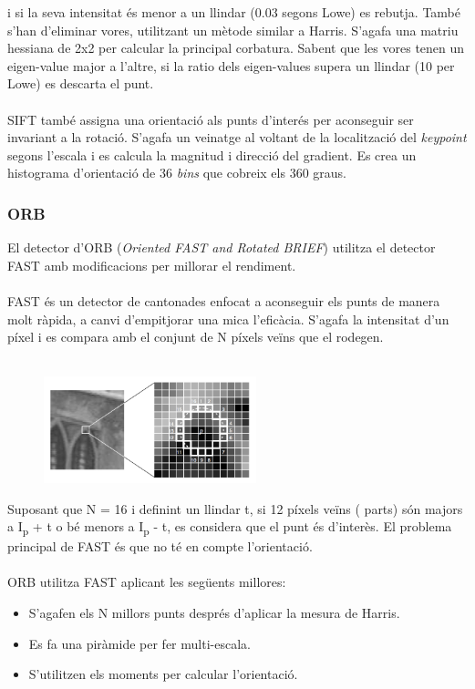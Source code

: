 	i si la seva intensitat és menor a un llindar (0.03 segons Lowe) es rebutja. També s'han d'eliminar vores, utilitzant un mètode similar a Harris.
	S'agafa una matriu hessiana de 2x2 per calcular la principal corbatura. Sabent que les vores tenen un eigen-value major a l'altre, si la ratio dels
	{eigen-values} supera un llindar (10 per Lowe) es descarta el punt. \\\\
	SIFT també assigna una orientació als punts d'interés per aconseguir ser invariant a la rotació. S'agafa un veinatge al voltant de la localització del
	\textit{keypoint} segons l'escala i es calcula la magnitud i direcció del gradient. Es crea un histograma d'orientació de 36 \textit{bins}
	que cobreix els 360 graus.

	\subsubsection{ORB}
	El detector d'ORB (\textit{Oriented FAST and Rotated BRIEF}) utilitza el detector FAST amb modificacions per millorar el rendiment.\\\\
	FAST és un detector de cantonades enfocat a aconseguir els punts de manera molt ràpida, a canvi d'empitjorar una mica l'eficàcia. S'agafa la intensitat d'un píxel i es compara amb el conjunt
	de N píxels veïns que el rodegen.\\\\
	\begin{figure}[H]
		\centering
		\includegraphics[width=0.55\textwidth]{images/fast}
	\end{figure}
	\noindent
	Suposant que N = 16 i definint un llindar t, si 12 píxels veïns ( parts) són majors a I\textsubscript{p} + t o bé menors a I\textsubscript{p} - t, es considera que el punt és d'interès.
	El problema principal de FAST és que no té en compte l'orientació.\\\\
	ORB utilitza FAST aplicant les següents millores:\\
	\begin{itemize}
		\item{S'agafen els N millors punts després d'aplicar la mesura de Harris.}
		\item{Es fa una piràmide per fer multi-escala.}
		\item{S'utilitzen els moments per calcular l'orientació.}
	\end{itemize}

